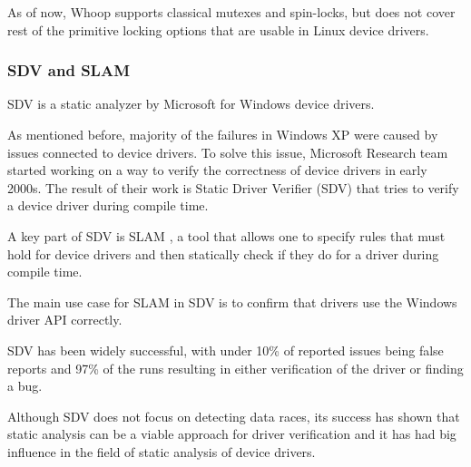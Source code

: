\documentclass[..thesis.tex]{subfiles}
\begin{document}
As of now, Whoop supports classical mutexes and spin-locks, but does not cover rest of the primitive locking options that are usable in Linux device drivers. 






\subsubsection{SDV and SLAM}

SDV is a static analyzer by Microsoft for Windows device drivers.

As mentioned before, majority of the failures in Windows XP were caused by issues connected to device drivers. To solve this issue, Microsoft Research team started working on a way to verify the correctness of device drivers in early 2000s. The result of their work is Static Driver Verifier (SDV) that tries to verify a device driver during compile time. 

A key part of SDV is SLAM \cite{ball_decade_2011}, a tool that allows one to specify rules that must hold for device drivers and then statically check if they do for a driver during compile time. 

The main use case for SLAM in SDV is to confirm that drivers use the Windows driver API correctly.
 
SDV has been widely successful, with under 10\%  of reported issues being false reports \cite[74]{ball_decade_2011} and 97\% of the runs resulting in either verification of the driver or finding a bug.

Although SDV does not focus on detecting data races, its success has shown that static analysis can be a viable approach for driver verification and it has had big influence in the field of static analysis of device drivers.

\end{document}
